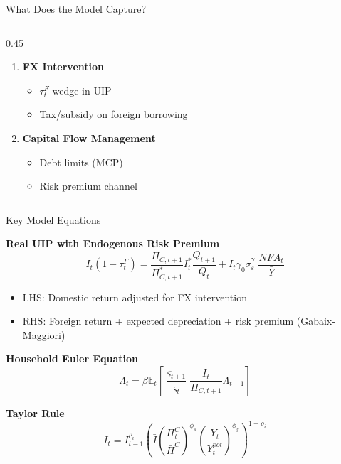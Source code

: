 \documentclass[aspectratio=169,12pt]{beamer}
\begin{document}
\begin{frame}{What Does the Model Capture?}
\begin{columns}[T]
\begin{column}{0.45\textwidth}
\begin{enumerate}
\vspace{0.2cm}
\item \textbf{FX Intervention}
\begin{itemize}
\item $\tau_t^F$ wedge in UIP
\item Tax/subsidy on foreign borrowing
\end{itemize}

\vspace{0.2cm}
\item \textbf{Capital Flow Management}
\begin{itemize}
\item Debt limits (MCP)
\item Risk premium channel
\end{itemize}
\end{enumerate}
\end{column}
\end{columns}

\end{frame}

\begin{frame}{Key Model Equations}

\textbf{Real UIP with Endogenous Risk Premium}
\begin{equation*}
I_t (1 - \tau_t^F) = \frac{\Pi_{C,t+1}}{\Pi_{C,t+1}^*} I_t^* \frac{Q_{t+1}}{Q_t} + I_t \gamma_0 \sigma_\varepsilon^{\gamma_1} \frac{NFA_t}{\bar{Y}}
\end{equation*}

\begin{itemize}
\item LHS: Domestic return adjusted for FX intervention
\item RHS: Foreign return + expected depreciation + risk premium (Gabaix-Maggiori)
\end{itemize}

\vspace{0.3cm}
\textbf{Household Euler Equation}
\begin{equation*}
\Lambda_t = \beta \mathbb{E}_t \left[ \frac{\varsigma_{t+1}}{\varsigma_t} \frac{I_t}{\Pi_{C,t+1}} \Lambda_{t+1} \right]
\end{equation*}

\vspace{0.3cm}
\textbf{Taylor Rule}
\begin{equation*}
I_t = I_{t-1}^{\rho_i} \left( \bar{I} \left(\frac{\Pi_t^C}{\bar{\Pi}^C}\right)^{\phi_\pi} \left(\frac{Y_t}{Y_t^{pot}}\right)^{\phi_y} \right)^{1-\rho_i}
\end{equation*}

\end{frame}
\end{document}
